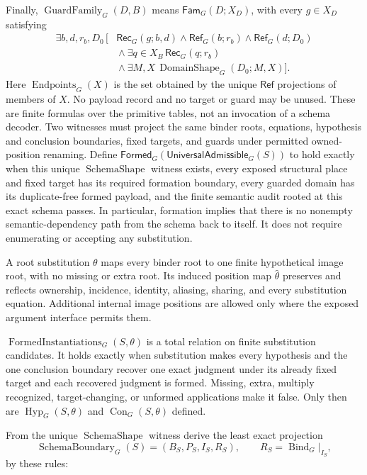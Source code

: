 \documentclass[11pt,twoside]{article}
\newcommand{\Formed}{\mathsf{Formed}}
\newcommand{\UniversalAdmissible}{\mathsf{UniversalAdmissible}}
\newcommand{\Rec}{\mathsf{Rec}}
\newcommand{\Fam}{\mathsf{Fam}}
\newcommand{\RefPos}{\mathsf{Ref}}
\begin{document}
Finally, \(\operatorname{GuardFamily}_G(D,B)\) means \(\Fam_G(D;X_D)\), with
every \(g\in X_D\) satisfying
\[
\begin{aligned}
 \exists b,d,r_b,D_0\,[{}&\Rec_G(g;b,d)
 \land\RefPos_G(b;r_b)\land\RefPos_G(d;D_0)\\[-0.3em]
 &{}\land\exists q\in X_B\,\Rec_G(q;r_b)\\[-0.3em]
 &{}\land\exists M,X\,\operatorname{DomainShape}_G(D_0;M,X)].
\end{aligned}
\]
Here \(\operatorname{Endpoints}_G(X)\) is the set obtained by the unique
\(\RefPos\) projections of members of \(X\).  No payload record and no target or
guard may be unused.  These are finite formulas over the primitive tables, not an
invocation of a schema decoder.  Two witnesses must project the same binder roots,
equations, hypothesis and conclusion boundaries, fixed targets, and guards under
permitted owned-position renaming.  Define
\(\Formed_G(\UniversalAdmissible_G(S))\) to hold exactly when this unique
\(\operatorname{SchemaShape}\) witness
exists, every exposed structural place and fixed target has its required formation
boundary, every guarded domain has its duplicate-free formed payload, and the
finite semantic audit rooted at this exact schema passes.  In particular, formation
implies that there is no nonempty semantic-dependency path from the schema back to
itself.  It does not require enumerating or accepting any substitution.

A root substitution \(\theta\) maps every binder root to one finite hypothetical
image root, with no missing or extra root.  Its induced position map
\(\widehat\theta\) preserves and reflects ownership, incidence, identity,
aliasing, sharing, and every substitution equation.  Additional internal image
positions are allowed only where the exposed argument interface permits them.

\(\operatorname{FormedInstantiations}_G(S,\theta)\) is a total relation on finite
substitution candidates.  It holds exactly when substitution makes every
hypothesis and the one conclusion boundary recover one exact judgment under its
already fixed target and each recovered judgment is formed.  Missing, extra,
multiply recognized, target-changing, or unformed applications make it false.  Only
then are \(\operatorname{Hyp}_G(S,\theta)\) and
\(\operatorname{Con}_G(S,\theta)\) defined.

From the unique \(\operatorname{SchemaShape}\) witness derive the least exact projection
\[
  \operatorname{SchemaBoundary}_G(S)
    =(B_S,P_S,I_S,R_S),
  \qquad R_S=\operatorname{Bind}_G|_{I_S},
\]
by these rules:
\end{document}
